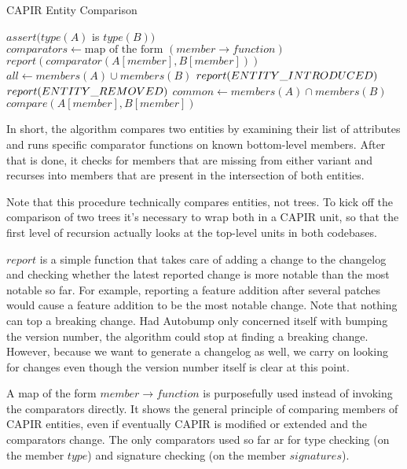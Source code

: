 \documentclass{l4proj}
\begin{document}
\begin{algorithm}
\caption{CAPIR Entity Comparison}
\begin{algorithmic}[1]
\State $assert(type(A)$ is $type(B))$
\State $comparators \gets \text{map of the form }(member \rightarrow function)$
$report(comparator(A[member], B[member]))$
\EndIf
\EndFor
\State $all \gets members(A) \cup members(B)$
$report(\detokenize{ENTITY_INTRODUCED})$
\EndIf
{}
$report(\detokenize{ENTITY_REMOVED})$
\EndIf
\EndFor
\State $common \gets members(A) \cap members(B)$
$compare(A[member], B[member])$
\EndFor
\EndProcedure
\end{algorithmic}
\end{algorithm}

In short, the algorithm compares two entities by examining their list
of attributes and runs specific comparator functions on known
bottom-level members. After that is done, it checks for members that
are missing from either variant and recurses into members that are
present in the intersection of both entities.

Note that this procedure technically compares entities, not trees. To
kick off the comparison of two trees it's necessary to wrap both in a
CAPIR unit, so that the first level of recursion actually looks at the
top-level units in both codebases.

$report$ is a simple function that takes care of adding a change to
the changelog and checking whether the latest reported change is more
notable than the most notable so far. For example, reporting a feature
addition after several patches would cause a feature addition to be
the most notable change. Note that nothing can top a breaking change.
Had Autobump only concerned itself with bumping the version number,
the algorithm could stop at finding a breaking change. However,
because we want to generate a changelog as well, we carry on looking
for changes even though the version number itself is clear at this point.

A map of the form $member \rightarrow function$ is purposefully used
instead of invoking the comparators directly. It shows the general
principle of comparing members of CAPIR entities, even if eventually
CAPIR is modified or extended and the comparators change. The only
comparators used so far ar for type checking (on the member $type$)
and signature checking (on the member $signatures$).
\end{document}
